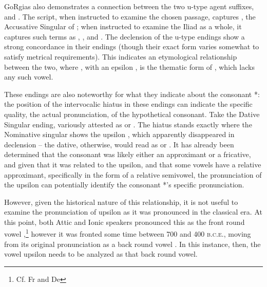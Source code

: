 

GoRgias also demonstrates a connection between the two
u-type agent suffixes,  and . The script, when
instructed to examine the chosen passage, captures , the
Accusative Singular of ; when instructed to examine the
Iliad as a whole, it captures such terms as ,
, and . The declension of the u-type
endings show a strong concordance in their endings (though
their exact form varies somewhat to satisfy metrical requirements).
This indicates an etymological relationship between the two, where
, with an epsilon , is the
thematic form of , which lacks any such vowel. 



These endings are also noteworthy for what they indicate about the
consonant *\w: the position of the intervocalic hiatus in these
endings can indicate the specific quality, the actual pronunciation,
of the hypothetical consonant.
Take the Dative Singular ending, variously attested as 
or . The hiatus stands exactly where the Nominative
singular shows the upsilon , which apparently
disappeared in declension -- the dative, otherwise, would read as
 or . It has already been determined
that the consonant was likely either an approximant or a fricative,
and given that it was related to the upsilon, and that some vowels
have a relative approximant, specifically in the form of a relative
semivowel, the pronunciation of the upsilon
can potentially identify the consonant *\w's specific pronunciation.

However, given the historical nature of this relationship, it is not
useful to examine the pronunciation of upsilon  as it was
pronounced in the classical era. At this point, both Attic and
Ionic speakers pronounced this as the front round vowel ,\footnote{Cf. Fr  and De } however it
was fronted some time between 700 and 400 \textsc{b.c.e.}, moving
from its original pronunciation as a back round vowel .\autocite[529]{malikouti-drachman_bortone_2015}
In this instance, then, the vowel upsilon  needs to be
analyzed as that back round vowel. 



